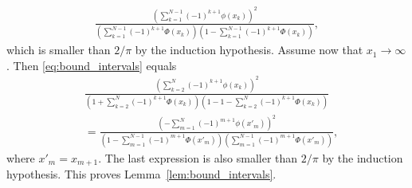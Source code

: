 \documentclass[letterpaper, conference]{IEEEtran}      %
\begin{document}
\begin{align*}
\frac{ \left(  \sum_{k=1}^{N-1} (-1)^{k+1}\phi(x_k) \right)^2} 
{\left( \sum_{k=1}^{N-1} (-1)^{k+1} \Phi(x_k) \right)\left(1- \sum_{k=1}^{N-1} (-1)^{k+1} \Phi(x_k)  \right) } ,
\end{align*}
which is smaller than $2/\pi$ by the induction hypothesis. Assume now that $x_1 \rightarrow \infty$. Then 
\eqref{eq:bound_intervals} equals
\begin{align*}
& \frac{ \left(  \sum_{k=2}^{N} (-1)^{k+1}\phi(x_k) \right)^2} 
{\left( 1 + \sum_{k=2}^{N} (-1)^{k+1} \Phi(x_k) \right)\left(1- 1 - \sum_{k=2}^{N} (-1)^{k+1} \Phi(x_k)  \right) }  \\
& = \frac{ \left(  -\sum_{m=1}^{N} (-1)^{m+1}\phi(x'_m) \right)^2} 
{\left( 1 - \sum_{m=1}^{N-1} (-1)^{m+1} \Phi(x'_{m}) \right)\left( \sum_{m=1}^{N-1} (-1)^{m+1} \Phi(x'_{m})  \right) },
\end{align*}
where $x'_{m} = x_{m+1}$. The last expression is also smaller than $2/\pi$ by the induction hypothesis. This proves Lemma~\ref{lem:bound_intervals}. \\
\end{document}
